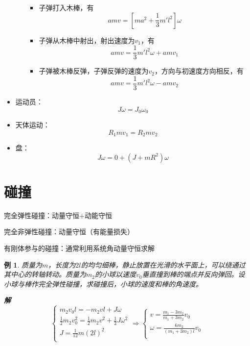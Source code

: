 \documentclass[12pt, a4paper, twoside]{ctexbook}
\newtheorem{example}[theorem]{例}
\begin{document}
\begin{itemize}
\begin{itemize}
\begin{figure}[H]
        \end{figure}
        \begin{itemize}
            \item 子弹打入木棒，有
            $$
            amv=\left[ma^2+\frac{1}{3}m'l^2\right]\omega
            $$
            \item 子弹从木棒中射出，射出速度为$v_1$，有
            $$
            amv=\frac{1}{3}m'l^2\omega+amv_1
            $$
            \item 子弹被木棒反弹，子弹反弹的速度为$v_2$，方向与初速度方向相反，有
            $$
            amv=\frac{1}{3}m'l^2\omega-amv_2
            $$
        \end{itemize} 
    \end{itemize}
    \item {\sonti 运动员}：
    $$
    J\omega=J_0\omega_0
    $$
    \item {\sonti 天体运动}：
    $$
    R_1mv_1=R_2mv_2
    $$
    \item {\sonti 盘}：
    $$
    J\omega=0+\left(J+mR^2\right)\omega
    $$
\end{itemize}
\section{碰撞}
{\sonti 完全弹性碰撞}：动量守恒+动能守恒

{\sonti 完全非弹性碰撞}：动量守恒（有能量损失）

{\sonti 有刚体参与的碰撞}：通常利用系统角动量守恒求解
\begin{example}
    质量为$m$，长度为$2l$的均匀细棒，静止放置在光滑的水平面上，可以绕通过其中心的转轴转动。质量为$m_2$的小球以速度$v_0$垂直撞到棒的端点并反向弹回。设小球与棒作完全弹性碰撞，求碰撞后，小球的速度和棒的角速度。
    
    \noindent\textbf{解}
    $$
    \left\{ \begin{array}{l}
	m_2v_0l=-m_2vl+J\omega\\
	\frac{1}{2}m_2v_{0}^{2}=\frac{1}{2}m_2v^2+\frac{1}{2}J\omega ^2\\
	J=\frac{1}{12}m\left( 2l \right) ^2\\
    \end{array}\Rightarrow \left\{ \begin{array}{l}
	v=\frac{m_1-3m_2}{m_1+3m_2}v_0\\
	\omega =\frac{6m_2}{\left( m_1+3m_2 \right) l}v_0\\
    \end{array} \right. \right. 
    $$
\end{example}
\end{document}
